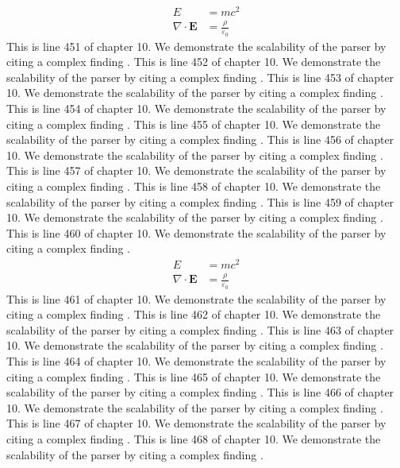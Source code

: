\begin{align*}
  E &= mc^2 \\
  \nabla \cdot \mathbf{E} &= \frac{\rho}{\varepsilon_0}
\end{align*}
This is line 451 of chapter 10. We demonstrate the scalability of the parser by citing a complex finding \cite{ref10_451}.
This is line 452 of chapter 10. We demonstrate the scalability of the parser by citing a complex finding \cite{ref10_452}.
This is line 453 of chapter 10. We demonstrate the scalability of the parser by citing a complex finding \cite{ref10_453}.
This is line 454 of chapter 10. We demonstrate the scalability of the parser by citing a complex finding \cite{ref10_454}.
This is line 455 of chapter 10. We demonstrate the scalability of the parser by citing a complex finding \cite{ref10_455}.
This is line 456 of chapter 10. We demonstrate the scalability of the parser by citing a complex finding \cite{ref10_456}.
This is line 457 of chapter 10. We demonstrate the scalability of the parser by citing a complex finding \cite{ref10_457}.
This is line 458 of chapter 10. We demonstrate the scalability of the parser by citing a complex finding \cite{ref10_458}.
This is line 459 of chapter 10. We demonstrate the scalability of the parser by citing a complex finding \cite{ref10_459}.
This is line 460 of chapter 10. We demonstrate the scalability of the parser by citing a complex finding \cite{ref10_460}.
\begin{align*}
  E &= mc^2 \\
  \nabla \cdot \mathbf{E} &= \frac{\rho}{\varepsilon_0}
\end{align*}
This is line 461 of chapter 10. We demonstrate the scalability of the parser by citing a complex finding \cite{ref10_461}.
This is line 462 of chapter 10. We demonstrate the scalability of the parser by citing a complex finding \cite{ref10_462}.
This is line 463 of chapter 10. We demonstrate the scalability of the parser by citing a complex finding \cite{ref10_463}.
This is line 464 of chapter 10. We demonstrate the scalability of the parser by citing a complex finding \cite{ref10_464}.
This is line 465 of chapter 10. We demonstrate the scalability of the parser by citing a complex finding \cite{ref10_465}.
This is line 466 of chapter 10. We demonstrate the scalability of the parser by citing a complex finding \cite{ref10_466}.
This is line 467 of chapter 10. We demonstrate the scalability of the parser by citing a complex finding \cite{ref10_467}.
This is line 468 of chapter 10. We demonstrate the scalability of the parser by citing a complex finding \cite{ref10_468}.
